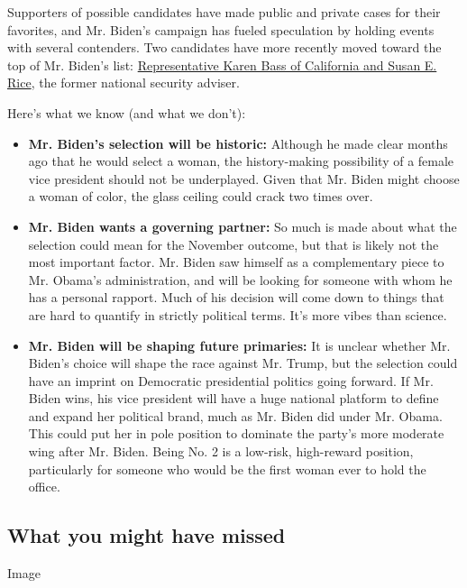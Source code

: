 Supporters of possible candidates have made public and private cases for
their favorites, and Mr. Biden's campaign has fueled speculation by
holding events with several contenders. Two candidates have more
recently moved toward the top of Mr. Biden's list:
\href{https://www.nytimes3xbfgragh.onion/2020/07/31/us/politics/joseph-biden-vice-president.html}{Representative
Karen Bass of California and Susan E. Rice}, the former national
security adviser.

Here's what we know (and what we don't):

\begin{itemize}
\item
  \textbf{Mr. Biden's selection will be historic:} Although he made
  clear months ago that he would select a woman, the history-making
  possibility of a female vice president should not be underplayed.
  Given that Mr. Biden might choose a woman of color, the glass ceiling
  could crack two times over.
\item
  \textbf{Mr. Biden wants a governing partner:} So much is made about
  what the selection could mean for the November outcome, but that is
  likely not the most important factor. Mr. Biden saw himself as a
  complementary piece to Mr. Obama's administration, and will be looking
  for someone with whom he has a personal rapport. Much of his decision
  will come down to things that are hard to quantify in strictly
  political terms. It's more vibes than science.
\item
  \textbf{Mr. Biden will be shaping future primaries:} It is unclear
  whether Mr. Biden's choice will shape the race against Mr. Trump, but
  the selection could have an imprint on Democratic presidential
  politics going forward. If Mr. Biden wins, his vice president will
  have a huge national platform to define and expand her political
  brand, much as Mr. Biden did under Mr. Obama. This could put her in
  pole position to dominate the party's more moderate wing after Mr.
  Biden. Being No. 2 is a low-risk, high-reward position, particularly
  for someone who would be the first woman ever to hold the office.
\end{itemize}

\hypertarget{what-you-might-have-missed}{%
\subsection{What you might have
missed}\label{what-you-might-have-missed}}

Image

